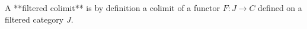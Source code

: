 A **filtered colimit** is by definition a colimit of a functor $F : J \rightarrow C$ defined on a filtered category $J$.
